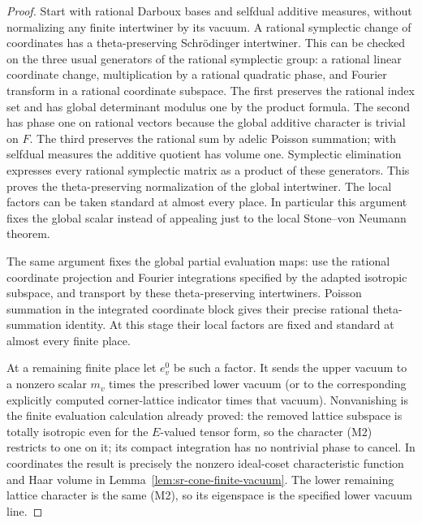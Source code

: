 \begin{proof}
Start with rational Darboux bases and selfdual additive measures,
without normalizing any finite intertwiner by its vacuum.
A rational symplectic change of coordinates has a theta-preserving
Schr\"odinger intertwiner. This can be checked on the three usual
generators of the rational symplectic group:
a rational linear coordinate change, multiplication by a
rational quadratic phase, and Fourier transform in a rational
coordinate subspace. The first preserves the rational index
set and has global determinant modulus one by the product
formula. The second has phase one on rational vectors because
the global additive character is trivial on \(F\).
The third preserves the rational sum by adelic Poisson summation;
with selfdual measures the additive quotient has volume one.
Symplectic elimination expresses every rational symplectic
matrix as a product of these generators. This proves the
theta-preserving normalization of the global intertwiner.
The local factors can be taken standard at almost every place.
In particular this argument fixes the global scalar instead
of appealing just to the local Stone--von Neumann theorem.

The same argument fixes the global partial evaluation maps:
use the rational coordinate projection and Fourier integrations
specified by the adapted isotropic subspace, and transport by
these theta-preserving intertwiners. Poisson summation in the
integrated coordinate block gives their precise rational
theta-summation identity. At this stage their local factors
are fixed and standard at almost every finite place.

At a remaining finite place let \(e_v^0\) be such a factor.
It sends the upper vacuum to a nonzero scalar \(m_v\) times
the prescribed lower vacuum (or to the corresponding explicitly
computed corner-lattice indicator times that vacuum).
Nonvanishing is the finite evaluation calculation already proved:
the removed lattice subspace is totally isotropic even for
the \(E\)-valued tensor form, so the character (M2) restricts
to one on it; its compact integration has no nontrivial phase
to cancel. In coordinates the result is precisely the
nonzero ideal-coset characteristic function and Haar volume
in Lemma~\ref{lem:sr-cone-finite-vacuum}.
The lower remaining lattice character is the same (M2),
so its eigenspace is the specified lower vacuum line.


\end{proof}
